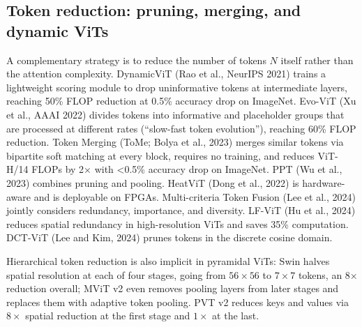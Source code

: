 \subsection{Token reduction: pruning, merging, and dynamic ViTs}\label{token-reduction-pruning-merging-and-dynamic-vits}

A complementary strategy is to reduce the number of tokens \(N\) itself rather than the attention complexity. DynamicViT (Rao et al., NeurIPS 2021) trains a lightweight scoring module to drop uninformative tokens at intermediate layers, reaching 50\% FLOP reduction at 0.5\% accuracy drop on ImageNet. Evo-ViT (Xu et al., AAAI 2022) divides tokens into informative and placeholder groups that are processed at different rates (``slow-fast token evolution''), reaching 60\% FLOP reduction. Token Merging (ToMe; Bolya et al., 2023) merges similar tokens via bipartite soft matching at every block, requires no training, and reduces ViT-H/14 FLOPs by 2× with \textless0.5\% accuracy drop on ImageNet. PPT (Wu et al., 2023) combines pruning and pooling. HeatViT (Dong et al., 2022) is hardware-aware and is deployable on FPGAs. Multi-criteria Token Fusion (Lee et al., 2024) jointly considers redundancy, importance, and diversity. LF-ViT (Hu et al., 2024) reduces spatial redundancy in high-resolution ViTs and saves 35\% computation. DCT-ViT (Lee and Kim, 2024) prunes tokens in the discrete cosine domain.

Hierarchical token reduction is also implicit in pyramidal ViTs: Swin halves spatial resolution at each of four stages, going from \(56 \times 56\) to \(7 \times 7\) tokens, an 8× reduction overall; MViT v2 even removes pooling layers from later stages and replaces them with adaptive token pooling. PVT v2 reduces keys and values via \(8 \times\) spatial reduction at the first stage and \(1 \times\) at the last.

